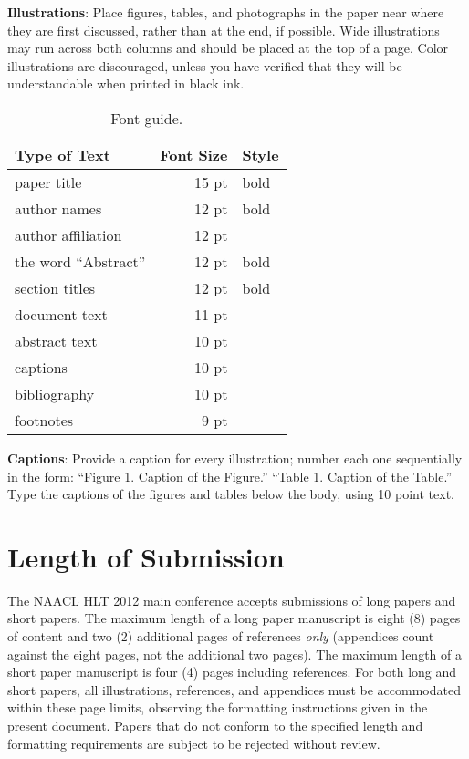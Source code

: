 \documentclass[11pt,letterpaper]{article}
\begin{document}
{\bf Illustrations}: Place figures, tables, and photographs in the
paper near where they are first discussed, rather than at the end, if
possible.  Wide illustrations may run across both columns and should be placed at
the top of a page. Color illustrations are discouraged, unless you have verified that 
they will be understandable when printed in black ink.

\begin{table}
\begin{center}
\begin{tabular}{|l|rl|}
\hline \bf Type of Text & \bf Font Size & \bf Style \\ \hline
paper title & 15 pt & bold \\
author names & 12 pt & bold \\
author affiliation & 12 pt & \\
the word ``Abstract'' & 12 pt & bold \\
section titles & 12 pt & bold \\
document text & 11 pt  &\\
abstract text & 10 pt & \\
captions & 10 pt & \\
bibliography & 10 pt & \\
footnotes & 9 pt & \\
\hline
\end{tabular}
\end{center}
\caption{\label{font-table} Font guide. }
\end{table}

{\bf Captions}: Provide a caption for every illustration; number each one
sequentially in the form:  ``Figure 1. Caption of the Figure.'' ``Table 1.
Caption of the Table.''  Type the captions of the figures and 
tables below the body, using 10 point text.  

\section{Length of Submission}
\label{sec:length}

The NAACL HLT 2012 main conference accepts submissions of long papers
and short papers.  The maximum length of a long paper manuscript is
eight (8) pages of content and two (2) additional pages of references
\emph{only} (appendices count against the eight pages, not the
additional two pages).  The maximum length of a short paper manuscript
is four (4) pages including references.  For both long and short
papers, all illustrations, references, and appendices must be
accommodated within these page limits, observing the formatting
instructions given in the present document.  Papers that do not
conform to the specified length and formatting requirements are
subject to be rejected without review.
\end{document}
